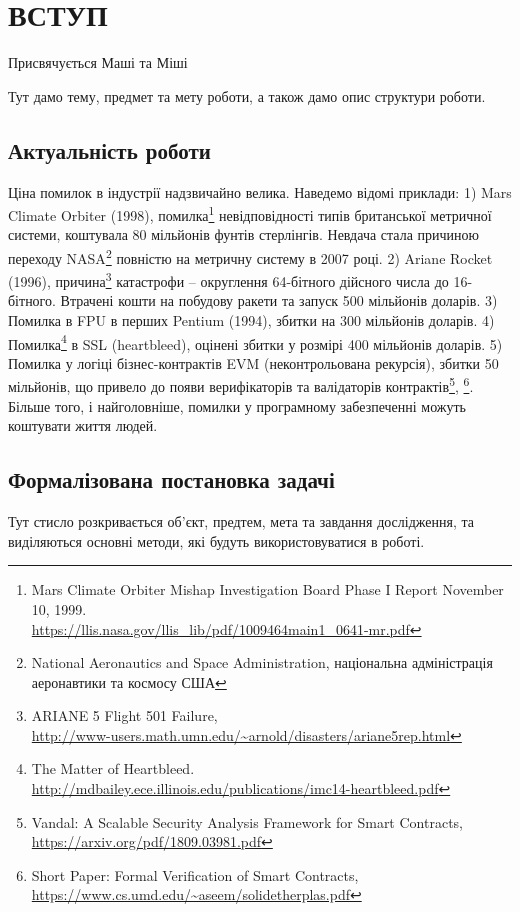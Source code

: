 \chapter*{ВСТУП}

\epigraph{Присвячується Маші та Міші}{}

Тут дамо тему, предмет та мету роботи, а також дамо опис структури роботи.

\section*{Актуальність роботи}
Ціна помилок в індустрії надзвичайно велика. Наведемо відомі приклади:
1) Mars Climate Orbiter (1998),
   помилка\footnote{Mars Climate Orbiter Mishap Investigation Board Phase I Report November 10, 1999. \\
                    \url{https://llis.nasa.gov/llis_lib/pdf/1009464main1_0641-mr.pdf}}
   невідповідності типів британської метричної системи, коштувала 80 мільйонів фунтів стерлінгів.
   Невдача стала причиною переходу
   NASA\footnote{National Aeronautics and Space Administration, національна адміністрація аеронавтики та космосу США}
   повністю на метричну систему в 2007 році.
2) Ariane Rocket (1996),
   причина\footnote{ARIANE 5 Flight 501 Failure, \\
          \url{http://www-users.math.umn.edu/~arnold/disasters/ariane5rep.html}}
   катастрофи -- округлення 64-бітного дійсного числа до 16-бітного.
   Втрачені кошти на побудову ракети та запуск 500 мільйонів доларів.
3) Помилка в FPU в перших Pentium (1994), збитки на 300 мільйонів доларів.
4) Помилка\footnote{The Matter of Heartbleed. \\
                    \url{http://mdbailey.ece.illinois.edu/publications/imc14-heartbleed.pdf}}
   в SSL (heartbleed), оцінені збитки у розмірі 400 мільйонів доларів.
5) Помилка у логіці бізнес-контрактів EVM (неконтрольована рекурсія), збитки 50 мільйонів,
   що привело до появи верифікаторів та валідаторів
   контрактів\footnote{Vandal: A Scalable Security Analysis Framework for Smart Contracts, \\
                       \url{https://arxiv.org/pdf/1809.03981.pdf}},
             \footnote{Short Paper: Formal Verification of Smart Contracts, \\
                       \url{https://www.cs.umd.edu/~aseem/solidetherplas.pdf}}.
Більше того, і найголовніше, помилки у програмному забезпеченні можуть коштувати життя людей.

\section*{Формалізована постановка задачі}
Тут стисло розкривається об'єкт, предтем, мета та завдання дослідження,
та виділяються основні методи, які будуть використовуватися в роботі.

